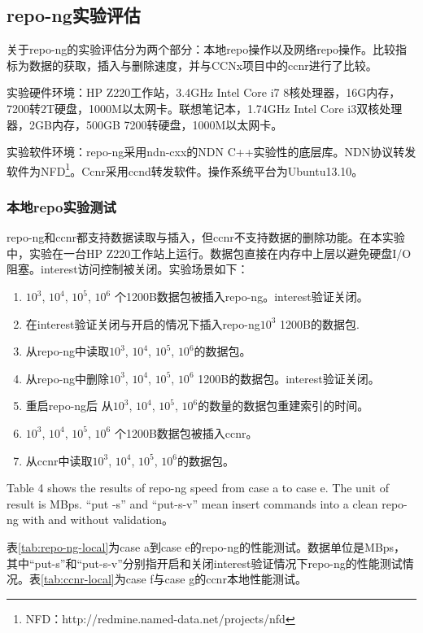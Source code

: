 \subsection{repo-ng实验评估}
关于repo-ng的实验评估分为两个部分：本地repo操作以及网络repo操作。比较指标为数据的获取，插入与删除速度，并与CCNx项目中的ccnr进行了比较。

实验硬件环境：HP Z220工作站，3.4GHz Intel Core i7 8核处理器，16G内存，7200转2T硬盘，1000M以太网卡。联想笔记本，1.74GHz Intel Core i3双核处理器，2GB内存，500GB 7200转硬盘，1000M以太网卡。

实验软件环境：repo-ng采用ndn-cxx的NDN C++实验性的底层库。NDN协议转发软件为NFD\footnote{NFD：http://redmine.named-data.net/projects/nfd}。Ccnr采用ccnd转发软件。操作系统平台为Ubuntu13.10。

\subsubsection{本地repo实验测试}
repo-ng和ccnr都支持数据读取与插入，但ccnr不支持数据的删除功能。在本实验中，实验在一台HP Z220工作站上运行。数据包直接在内存中上层以避免硬盘I/O阻塞。interest访问控制被关闭。实验场景如下：

\begin{enumerate}[a]
\item $10^3$, $10^4$, $10^5$, $10^6$ 个1200B数据包被插入repo-ng。interest验证关闭。
\item 在interest验证关闭与开启的情况下插入repo-ng$10^3$ 1200B的数据包.
\item 从repo-ng中读取$10^3$, $10^4$, $10^5$, $10^6$的数据包。
\item 从repo-ng中删除$10^3$, $10^4$, $10^5$, $10^6$ 1200B的数据包。interest验证关闭。 
\item 重启repo-ng后 从$10^3$, $10^4$, $10^5$, $10^6$的数量的数据包重建索引的时间。
\item $10^3$, $10^4$, $10^5$, $10^6$ 个1200B数据包被插入ccnr。
\item 从ccnr中读取$10^3$, $10^4$, $10^5$, $10^6$的数据包。
\end{enumerate}

Table 4 shows the results of repo-ng speed from case a to case e. The unit of result is MBps. ``put -s'' and ``put-s-v'' mean insert commands into a clean repo-ng with and without validation。

表\ref{tab:repo-ng-local}为case a到case e的repo-ng的性能测试。数据单位是MBps，其中“put-s”和“put-s-v”分别指开启和关闭interest验证情况下repo-ng的性能测试情况。表\ref{tab:ccnr-local}为case f与case g的ccnr本地性能测试。


